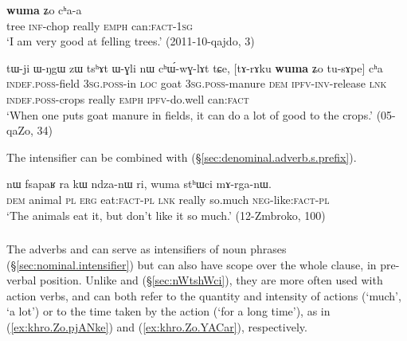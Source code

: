 \begin{exe}
\ex \label{ex:wuma.Zo.chaa}
\gll [si kɤ-pʰaʁ] \textbf{wuma} ʑo cʰa-a \\
tree \textsc{inf}-chop really \textsc{emph} can:\textsc{fact}-\textsc{1sg} \\
\glt `I am very good at felling trees.' (2011-10-qajdo, 3)
\end{exe}

\begin{exe}
\ex \label{ex:wuma.tusApe.cha}
\gll tɯ-ji ɯ-ŋgɯ zɯ tsʰɤt ɯ-ɣli nɯ cʰɯ́-wɣ-lɤt tɕe, [tɤ-rɤku \textbf{wuma} ʑo tu-sɤpe] cʰa \\
\textsc{indef}.\textsc{poss}-field \textsc{3sg}.\textsc{poss}-in \textsc{loc} goat \textsc{3sg}.\textsc{poss}-manure \textsc{dem} \textsc{ipfv}-\textsc{inv}-release \textsc{lnk} \textsc{indef}.\textsc{poss}-crops really \textsc{emph} \textsc{ipfv}-do.well can:\textsc{fact} \\
\glt `When one puts goat manure in fields, it can do a lot of good to the crops.' (05-qaZo, 34)
\end{exe}

The intensifier  can be combined with  (§\ref{sec:denominal.adverb.s.prefix}).  

\begin{exe}
\ex \label{ex:wuma.sthWci}
\gll nɯ fsapaʁ ra kɯ ndza-nɯ ri, wuma stʰɯci mɤ-rga-nɯ. \\
\textsc{dem} animal \textsc{pl} \textsc{erg} eat:\textsc{fact}-\textsc{pl} \textsc{lnk} really so.much \textsc{neg}-like:\textsc{fact}-\textsc{pl} \\
\glt `The animals eat it, but don't like it so much.' (12-Zmbroko, 100)
\end{exe}
 
\subsubsection{} \label{sec:khro}
The adverbs  and  can serve as intensifiers of noun phrases (§\ref{sec:nominal.intensifier}) but can also have scope over the whole clause, in pre-verbal position. Unlike  and  (§\ref{sec:nWtshWci}), they are more often used with action verbs, and can both refer to the quantity and intensity of actions (`much', `a lot') or to the time taken by the action (`for a long time'), as in (\ref{ex:khro.Zo.pjANke}) and (\ref{ex:khro.Zo.YACar}), respectively.


